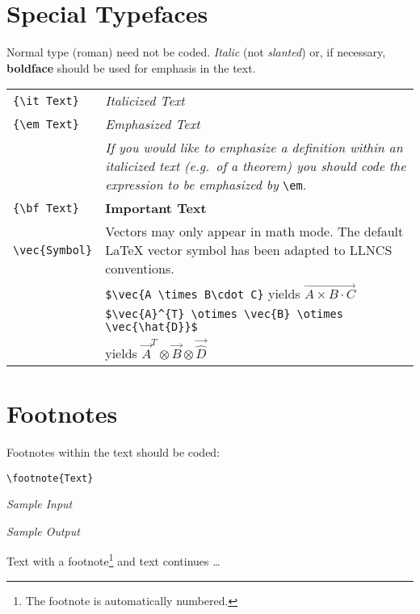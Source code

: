 \section {Special Typefaces}
%
Normal type (roman) need not be coded. {\it Italic}
(not {\sl slanted}) or, if necessary, {\bf boldface}
should be used for emphasis in the text.
\begin{flushleft}
\begin{tabular}{@{}p{}p{}}
\verb|{\it Text}|   & {\it Italicized Text}\\
\verb|{\em Text}|   & {\em Emphasized Text}\\
 & {\it If you would like to emphasize a {\em definition} within an
   italicized text (e.g.\ of a {\em theorem)} you should code the
   expression to be emphasized by} \verb|\em|.\\
\verb|{\bf Text}|   & {\bf Important Text}\\
\verb|\vec{Symbol}| & Vectors may only appear in math mode. The default
   \LaTeX{} vector symbol has been adapted to LLNCS conventions.\\
 & \verb|$\vec{A \times B\cdot C}| yields $\vec{A\times B\cdot C}$\\
 & \verb|$\vec{A}^{T} \otimes \vec{B} \otimes \vec{\hat{D}}$|\\
 & yields $\vec{A}^{T} \otimes \vec{B} \otimes \vec{\hat{D}}$
\end{tabular}
\end{flushleft}
%
\section {Footnotes}
%
Footnotes within the text should be coded:
\begin{verbatim}
\footnote{Text}
\end{verbatim}
{\it Sample Input}
{\it Sample Output}
\begin{flushleft}
Text with a footnote\footnote{The footnote is automatically numbered.}
and text continues \dots
\end{flushleft}
%

